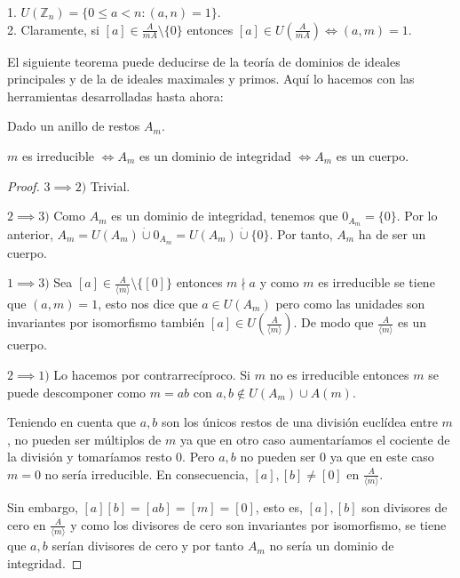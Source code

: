 \begin{example}
1. $U(\mathbb{Z}_n) = \{0 \le a < n:(a,n) = 1\}$. \\
2. Claramente, si $[a] \in \frac{A}{mA} \setminus \{0\}$ entonces $[a] \in U(\frac{A}{mA}) \iff (a,m) = 1$.  
\end{example}

El siguiente teorema puede deducirse de la teoría de dominios de ideales principales y de la de ideales maximales y primos. Aquí lo hacemos con las herramientas desarrolladas hasta ahora:

\begin{theorem}
Dado un anillo de restos $A_m$. 

$m$ es irreducible $\iff A_m$ es un dominio de integridad $\iff A_m$ es un cuerpo.
\end{theorem}
\begin{proof}
$3 \implies 2)$ Trivial. 

$2 \implies 3)$ Como $A_m$ es un dominio de integridad, tenemos que $0_{A_m} = \{0\}$. Por lo anterior, $A_m = U(A_m) \dot\cup 0_{A_m} = U(A_m) \dot\cup \{0\}$. Por tanto, $A_m$ ha de ser un cuerpo. 

$1 \implies 3)$ Sea $[a] \in \frac{A}{\langle m \rangle} \setminus \{[0]\}$ entonces $m \nmid a$ y como $m$ es irreducible se tiene que $(a,m) = 1$, esto nos dice que $a \in U(A_m)$ pero como las unidades son invariantes por isomorfismo también $[a] \in U(\frac{A}{\langle m \rangle})$. De modo que $\frac{A}{\langle m \rangle}$ es un cuerpo. 

$2 \implies 1)$ Lo hacemos por contrarrecíproco. Si $m$ no es irreducible entonces $m$ se puede descomponer como $m = ab$ con $a,b \notin U(A_m) \cup A(m)$. 

Teniendo en cuenta que $a,b$ son los únicos restos de una división euclídea entre $m$, no pueden ser múltiplos de $m$ ya que en otro caso aumentaríamos el cociente de la división y tomaríamos resto $0$. Pero $a,b$ no pueden ser $0$ ya que en este caso $m = 0$ no sería irreducible. En consecuencia, $[a],[b] \neq [0]$ en $\frac{A}{\langle m \rangle}$. 

Sin embargo, $[a][b] = [ab] = [m] = [0]$, esto es, $[a],[b]$ son divisores de cero en $\frac{A}{\langle m \rangle}$ y como los divisores de cero son invariantes por isomorfismo, se tiene que $a,b$ serían divisores de cero y por tanto $A_m$ no sería un dominio de integridad. 
\end{proof}

